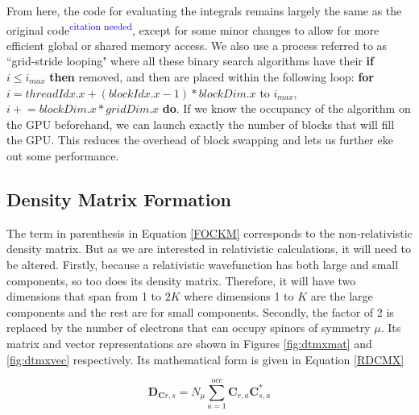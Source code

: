 \documentclass[12pt]{report}
\newcommand{\citethis}{\textsuperscript{\textcolor{blue}{citation needed}}} %
\begin{document}
From here, the code for evaluating the integrals remains largely the same as the original code\citethis{}, except for some minor changes to allow for more efficient global or shared memory access. We also use a process referred to as ``grid-stride looping" where all these binary search algorithms have their \textbf{if} $i \le i_{max}$ \textbf{then} removed, and then are placed within the following loop: \textbf{for} $i = threadIdx.x + (blockIdx.x - 1) * blockDim.x$ to $i_{max}$, $i \mathrel{+}= blockDim.x * gridDim.x$ \textbf{do}. If we know the occupancy of the algorithm on the GPU beforehand, we can launch exactly the number of blocks that will fill the GPU. This reduces the overhead of block swapping and lets us further eke out some performance.

\subsection{Density Matrix Formation}
The term in parenthesis in Equation \ref{FOCKM} corresponds to the non-relativistic density matrix. But as we are interested in relativistic calculations, it will need to be altered. Firstly, because a relativistic wavefunction has both large and small components, so too does its density matrix. Therefore, it will have two dimensions that span from 1 to $2K$ where dimensions 1 to $K$ are the large components and the rest are for small components. Secondly, the factor of 2 is replaced by the number of electrons that can occupy spinors of symmetry $\mu$. Its matrix and vector representations are shown in Figures \ref{fig:dtmxmat} and \ref{fig:dtmxvec} respectively. Its mathematical form is given in Equation \ref{RDCMX}

\begin{equation}
\label{RDCMX}
\textbf{D$_{\textbf{C}r,s}$} =N_{\mu}\sum^{occ}_{a=1}\textbf{C}_{r,a}\textbf{C}^{*}_{s,a}
\end{equation}
\end{document}
